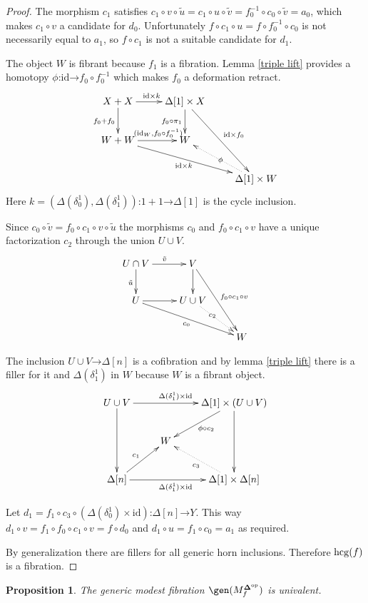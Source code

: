 \documentclass{amsart}
\theoremstyle{plain}
\newtheorem{prop}[theorem]{Proposition}
\theoremstyle{definition}
\newcommand\id{\mathrm{id}}
\newcommand\dual{^{\mathrm{op}}}
\newcommand\simCat{\mathbf\Delta}
\newcommand\s{^{\simCat\dual}}
\newcommand\of{\mathord:}
\renewcommand\to{\mathord\rightarrow}
\newcommand\simplex\Delta
\newcommand\f{_f}
\begin{document}
\begin{proof}
The morphism $c_1$ satisfies $c_1\circ v\circ \tilde u = c_1\circ u\circ\tilde v = f_0^{-1}\circ c_0\circ \tilde v = a_0$, which makes $c_1\circ v$ a candidate for $d_0$. Unfortunately $f\circ c_1\circ u = f\circ f_0^{-1}\circ c_0$ is not necessarily equal to $a_1$, so $f\circ c_1$ is not a suitable candidate for $d_1$.

The object $W$ is fibrant because $f_1$ is a fibration. Lemma \ref{triple lift} provides a homotopy $\phi\of\id\to f_0\circ f_0^{-1}$ which makes $f_0$ a deformation retract.
\[\xymatrix{
X+X\ar[d]_{f_0+f_0} \ar[r]^{\id\times k} & \simplex[1]\times X \ar[ddr]^{\id\times f_0} \ar[d]_{f_0\circ \pi_1}\\
W+W\ar[drr]_{\id\times k}\ar[r]^(.6){(\id_W,f_0\circ f_0^{-1})} & W \\
 && \simplex[1]\times W \ar@{.>}[ul]|\phi
}\]
Here $k=(\simplex(\delta_0^1),\simplex(\delta^1_1))\of 1+1\to \simplex[1]$ is the cycle inclusion.

Since $c_0\circ \tilde v = f_0\circ c_1\circ v\circ \tilde u$ the morphisms $c_0$ and $f_0\circ c_1\circ v$ have a unique factorization $c_2$ through the union $U\cup V$.
\[ \xymatrix{
U\cap V \ar[r]^{\tilde v}\ar[d]_{\tilde u} & V\ar[d]\ar[ddr]^{f_0\circ c_1 \circ v}\\
U \ar[r]\ar[drr]_{c_0} & U\cup V\ar@{.>}|(.4){c_2}[dr] \\
&& W
}\]

The inclusion $U\cup V\to \simplex[n]$ is a cofibration and by lemma \ref{triple lift} there is a filler for it and $\simplex(\delta^1_1)$ in $W$ because $W$ is a fibrant object.
\[\xymatrix{
U\cup V\ar[dd] \ar[rr]^{\simplex(\delta^1_1)\times \id} && \simplex[1]\times (U\cup V)\ar[dd] \ar[dl]^{\phi\circ c_2} \\
& W\\
\simplex[n] \ar[rr]_{\simplex(\delta^1_1)\times \id} \ar[ur]^{c_1} && \simplex[1]\times\simplex[n] \ar@{.>}[ul]^{c_3}
}\]

Let $d_1=f_1\circ c_3\circ(\simplex(\delta^1_0)\times \id)\of\simplex[n]\to Y$. This way $d_1\circ v=f_1\circ f_0\circ c_1\circ v = f\circ d_0$ and $d_1\circ u = f_1\circ c_0 = a_1$ as required.

By generalization there are fillers for all generic horn inclusions. Therefore $\mathrm{hcg}(f)$ is a fibration.
\end{proof}


\begin{prop} The generic modest fibration $\gen(M\s\f)$ is univalent. \label{univalence} \end{prop}
\end{document}
